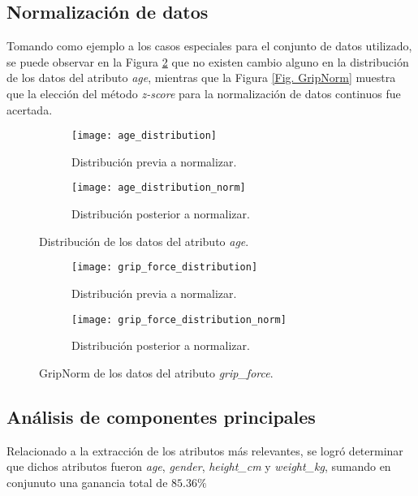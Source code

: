 \subsection{Normalización de datos}
Tomando como ejemplo a los casos especiales para el conjunto de datos utilizado, se puede observar en la Figura \ref{Fig. AgeNorm} que no existen cambio alguno en la distribución de los datos del atributo \emph{age}, mientras que la Figura \ref{Fig. GripNorm} muestra que la elección del método \emph{z-score} para la normalización de datos continuos fue acertada.

\begin{figure}[hb]
	\centering
	\begin{subfigure}{\textwidth}
         \centering
         \texttt{[image: age\_distribution]}
         \caption{Distribución previa a normalizar.}
	\end{subfigure}
	\vfill
	\begin{subfigure}{\textwidth}
         \centering
         \texttt{[image: age\_distribution\_norm]}
         \caption{Distribución posterior a normalizar.}
	\end{subfigure}
	\caption{Distribución de los datos del atributo \emph{age}.}
	\label{Fig. AgeNorm}
\end{figure}

\begin{figure}[ht]
	\centering
	\begin{subfigure}{\textwidth}
         \centering
         \texttt{[image: grip\_force\_distribution]}
         \caption{Distribución previa a normalizar.}
	\end{subfigure}
	\vfill
	\begin{subfigure}{\textwidth}
         \centering
         \texttt{[image: grip\_force\_distribution\_norm]}
         \caption{Distribución posterior a normalizar.}
	\end{subfigure}
	\caption{GripNorm de los datos del atributo \emph{grip\_force}.}
	\label{Fig. AgeNorm}
\end{figure}

\FloatBarrier
\subsection{Análisis de componentes principales}
Relacionado a la extracción de los atributos más relevantes, se logró determinar que dichos atributos fueron \emph{age}, \emph{gender}, \emph{height\_cm} y \emph{weight\_kg}, sumando en conjunuto una ganancia total de $85.36\%$

